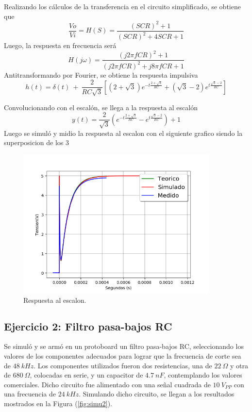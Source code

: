 \documentclass[a4paper]{article}
\begin{document}
Realizando los cálculos de la transferencia en el circuito simplificado, se obtiene que
\begin{equation}
 \frac{Vo}{Vi}=H(S)=\frac{ \left( SCR \right)^2 + 1}{\left( SCR \right)^2 + 4SCR + 1}
 \label{equ:Hhdes}
\end{equation} 
Luego, la respuesta en frecuencia será
\begin{equation}
 H(j\omega)=\frac{ \left( j 2\pi f CR \right)^2 + 1}{\left( j 2\pi f CR \right)^2 + j 8\pi fCR + 1}
 \label{equ:Hdejomega}
\end{equation}
Antitransformando por Fourier, se obtiene la respuesta impulsiva
\begin{equation}
 h(t)=\delta \left( t \right) \ + \ \frac{2}{RC\sqrt{3}} \left[ \left( 2 + \sqrt{3} \right) e^{-t\frac{2 + \sqrt{3}}{RC}} + \left( \sqrt{3} - 2 \right) e^{t\frac{\sqrt{3} - 2}{RC}} \right]
 \label{equ:hdet}
\end{equation}

Convolucionando con el escalón, se llega a la respuesta al escalón
\begin{equation}
 y(t) = \frac{2}{\sqrt{3}} \left( e^{-t\frac{2 + \sqrt{3}}{RC}} - e^{t\frac{\sqrt{3} - 2}{RC}} \right) + 1
\label{equ:h*u}
\end{equation} 
Luego se simuló y midio la respuesta al escalon con el siguiente grafico siendo la superposicion de los 3
\begin{figure}[H]
	\centering
	\includegraphics[width=0.9\textwidth]{StepResponse.png}
\caption{Respuesta al escalon.}
	\label{fig:stepResponse}
\end{figure}

\subsection{Ejercicio 2: Filtro pasa-bajos RC}
Se simuló y se armó en un protoboard un filtro pasa-bajos RC, seleccionando los valores de los componentes adecuados para lograr que la frecuencia de corte sea de $ 48 \ kHz $. Los componentes utilizados fueron dos resistencias, una de $22 \ \Omega$ y otra de $680 \ \Omega$, colocadas en serie, y un capacitor de $4.7 \ nF$, contemplando los valores comerciales.
Dicho circuito fue alimentado con una señal cuadrada de $ 10 \ V_{PP} $ con una frecuencia de $ 24 \ kHz $.
Simulando dicho circuito, se llegan a los resultados mostrados en la Figura (\ref{fig:simu2}).
\end{document}
